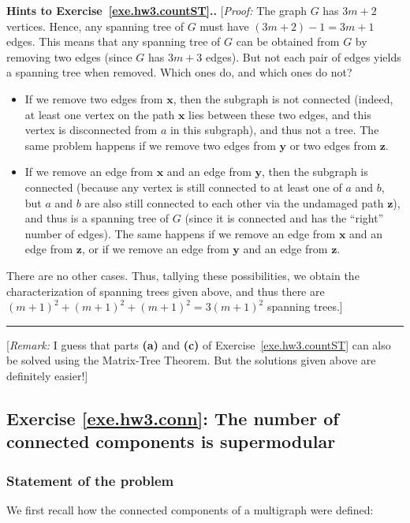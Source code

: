 \documentclass[numbers=enddot,12pt,final,onecolumn,notitlepage]{scrartcl}%
\theoremstyle{definition}
\newenvironment{proof}[1][Proof]{\noindent\textbf{#1.} }{\ \rule{0.5em}{0.5em}}
\newcommand{\tup}[1]{\left( #1 \right)}
\begin{document}
\begin{proof}[Hints to Exercise~\ref{exe.hw3.countST}.]
[\textit{Proof:} The graph $G$ has $3m+2$ vertices.
Hence, any spanning tree of $G$ must have $\tup{3m+2}-1 = 3m+1$ edges.
This means that any spanning tree of $G$ can be obtained from $G$ by
removing two edges (since $G$ has $3m+3$ edges).
But not each pair of edges yields a spanning tree when removed.
Which ones do, and which ones do not?
\begin{itemize}
\item If we remove two edges from $\mathbf{x}$, then the subgraph is
      not connected (indeed, at least one vertex on the path
      $\mathbf{x}$ lies between these two edges, and this vertex is
      disconnected from $a$ in this subgraph), and thus not a tree.
      The same problem happens if we remove two edges from
      $\mathbf{y}$ or two edges from $\mathbf{z}$.
\item If we remove an edge from $\mathbf{x}$ and an edge from
      $\mathbf{y}$, then the subgraph is connected (because any
      vertex is still connected to at least one of $a$ and $b$, but
      $a$ and $b$ are also still connected to each other via the
      undamaged path $\mathbf{z}$), and thus is a spanning tree of $G$
      (since it is connected and has the ``right'' number of edges).
      The same happens if we remove an
      edge from $\mathbf{x}$ and an edge from $\mathbf{z}$, or if we
      remove an edge from $\mathbf{y}$ and an edge from $\mathbf{z}$.
\end{itemize}
There are no other cases.
Thus, tallying these possibilities, we obtain the characterization of
spanning trees given above, and thus there are
$\tup{m+1}^2 + \tup{m+1}^2 + \tup{m+1}^2 = 3 \tup{m+1}^2$ spanning
trees.]
\end{proof}

[\textit{Remark:} I guess that parts \textbf{(a)} and \textbf{(c)} of
Exercise~\ref{exe.hw3.countST} can also be solved using the
Matrix-Tree Theorem. But the solutions given above are definitely
easier!]

\subsection{Exercise \ref{exe.hw3.conn}: The number of connected
components is supermodular}

\subsubsection{Statement of the problem}

We first recall how the connected components of a multigraph were
defined:
\end{document}
